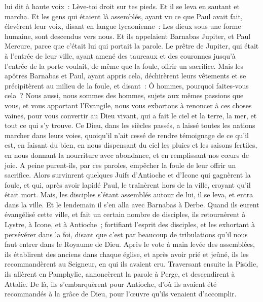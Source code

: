 \begin{multicols}{2}
lui dit à haute voix~: Lève-toi droit sur tes pieds. Et il se leva en sautant et marcha.
Et les gens qui étaient là assemblés, ayant vu ce que Paul avait fait, élevèrent leur voix, disant en langue lycaonienne~: Les dieux sous une forme humaine, sont descendus vers nous.
Et ils appelaient Barnabas Jupiter, et Paul Mercure, parce que c'était lui qui portait la parole.
Le prêtre de Jupiter, qui était à l'entrée de leur ville, ayant amené des taureaux et des couronnes jusqu'à l'entrée de la porte voulait, de même que la foule, offrir un sacrifice.
Mais les apôtres Barnabas et Paul, ayant appris cela, déchirèrent leurs vêtements et se précipitèrent au milieu de la foule,
et disant~: Ô hommes, pourquoi faites-vous cela~? Nous aussi, nous sommes des hommes, sujets aux mêmes passions que vous, et vous apportant l'Evangile, nous vous exhortons à renoncer à ces choses vaines, pour vous convertir au Dieu vivant, qui a fait le ciel et la terre, la mer, et tout ce qui s'y trouve.
Ce Dieu, dans les siècles passés, a laissé toutes les nations marcher dans leurs voies,
quoiqu'il n'ait cessé de rendre témoignage de ce qu'il est, en faisant du bien, en nous dispensant du ciel les pluies et les saisons fertiles, en nous donnant la nourriture avec abondance, et en remplissant nos cœurs de joie.
A peine purent-ils, par ces paroles, empêcher la foule de leur offrir un sacrifice.
Alors survinrent quelques Juifs d'Antioche et d'Icone qui gagnèrent la foule, et qui, après avoir lapidé Paul, le traînèrent hors de la ville, croyant qu'il était mort.
Mais, les disciples s'étant assemblés autour de lui, il se leva, et entra dans la ville. Et le lendemain il s'en alla avec Barnabas à Derbe.
Quand ils eurent évangélisé cette ville, et fait un certain nombre de disciples, ils retournèrent à Lystre, à Icone, et à Antioche~;
fortifiant l'esprit des disciples, et les exhortant à persévérer dans la foi, disant que c'est par beaucoup de tribulations qu'il nous faut entrer dans le Royaume de Dieu.
Après le vote à main levée des assemblées, ils établirent des anciens dans chaque église, et après avoir prié et jeûné, ils les recommandèrent au Seigneur, en qui ils avaient cru.
Traversant ensuite la Pisidie, ils allèrent en Pamphylie,
annoncèrent la parole à Perge, et descendirent à Attalie.
De là, ils s'embarquèrent pour Antioche, d'où ils avaient été recommandés à la grâce de Dieu, pour l'œuvre qu'ils venaient d'accomplir.

\end{multicols}
